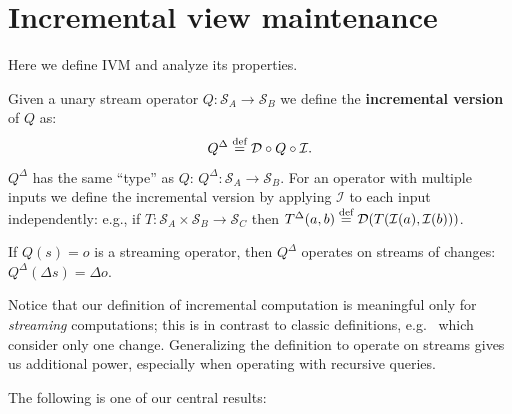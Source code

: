 \documentclass[twocolumn
]{svjour3}
\numberwithin{equation}{section}
\newcommand{\defined}[1]{\textbf{#1}\index{}}
\newcommand{\stream}[1]{\ensuremath{\mathcal{S}_{#1}}}
\newcommand{\I}{\mathcal{I}}  %
\newcommand{\D}{\mathcal{D}}  %
\newcommand{\I}{\mathit{I}}  %
\newcommand{\D}{\mathit{D}}  %
\newcommand{\inc}[1]{{#1}^{\Delta}}
\newcommand{\defn}{\stackrel{\textrm{\scriptsize def}}{=}}
\begin{document}
\section{Incremental view maintenance}\label{sec:incremental}

Here we define IVM and analyze its properties.

\begin{definition}
Given a unary stream operator $Q: \stream{A} \to \stream{B}$ we define the
\defined{incremental version} of $Q$ as:
\begin{equation}\label{def:inc}
\inc{Q} \defn \D \circ Q \circ \I.
\end{equation}
$\inc{Q}$ has the same ``type'' as $Q$: $\inc{Q}: \stream{A} \to \stream{B}$.
For an operator with multiple inputs we define
the incremental version by applying $\I$ to each input independently:
e.g., if $T: \stream{A} \times \stream{B} \rightarrow \stream{C}$ then
$\inc{T}(a, b) \defn \D (T(\I(a), \I(b)))$.
\end{definition}

\begin{center}
\end{center}
If $Q(s) = o$ is a streaming operator, then $\inc{Q}$ operates on
streams of changes: $\inc{Q}(\Delta s) = \Delta o$.

Notice that our definition of incremental computation is meaningful only for \emph{streaming}
computations; this is in contrast to classic definitions, e.g.~\cite{gupta-idb95} which
consider only one change.  Generalizing the definition to operate on streams gives us
additional power, especially when operating with recursive queries.

The following is one of our central results:
\end{document}
